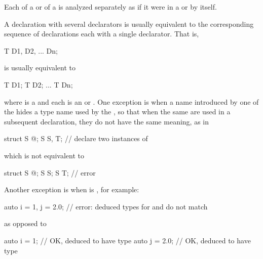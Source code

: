 \pnum
Each  of a 
or  of a 
is analyzed separately as if it were in a
 or  by itself.
\begin{note}
A declaration with several declarators is usually equivalent to the corresponding
sequence of declarations each with a single declarator. That is,
\begin{codeblock}
T D1, D2, ... Dn;
\end{codeblock}
is usually equivalent to
\begin{codeblock}
T D1; T D2; ... T Dn;
\end{codeblock}
where  is a 
and each  is
an  or .
One exception is when a name introduced by one of the
 hides a type name used by the
, so that when the same
 are used in a subsequent declaration,
they do not have the same meaning, as in
\begin{codeblock}
struct S { @\commentellip@ };
S S, T;                 // declare two instances of 
\end{codeblock}
which is not equivalent to
\begin{codeblock}
struct S { @\commentellip@ };
S S;
S T;                    // error
\end{codeblock}
Another exception is when  is ,
for example:
\begin{codeblock}
auto i = 1, j = 2.0;    // error: deduced types for  and  do not match
\end{codeblock}
as opposed to
\begin{codeblock}
auto i = 1;             // OK,  deduced to have type 
auto j = 2.0;           // OK,  deduced to have type 
\end{codeblock}
\end{note}

